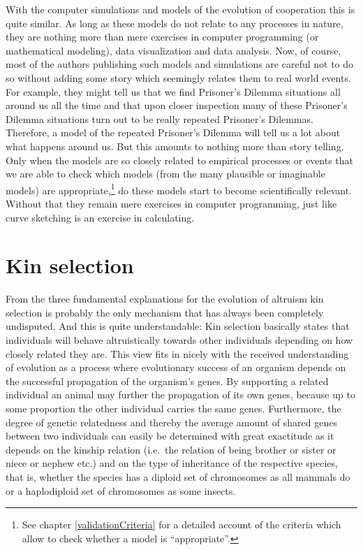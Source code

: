 With the computer simulations and models of the evolution of cooperation this
is quite similar. As long as these models do not relate to any processes in
nature, they are nothing more than mere exercises in computer programming (or
mathematical modeling), data visualization and data analysis. Now, of course,
most of the authors publishing such models and simulations are careful not to
do so without adding some story which seemingly relates them
to real world events. For example, they might tell us that we find Prisoner's
Dilemma situations all around us all the time and that upon closer inspection
many of these Prisoner's Dilemma situations turn out to be really repeated
Prisoner's Dilemmas. Therefore, a model of the repeated Prisoner's Dilemma will
tell us a lot about what happens around us. But this amounts to nothing more
than story telling. Only when the models are so closely related to
empirical processes or events that we are able to check which models (from the
many plausible or imaginable models) are appropriate,\footnote{See chapter
\ref{validationCriteria} for a detailed account of the criteria which allow to 
check whether a model is ``appropriate''.} do these
models start to become scientifically relevant. Without that they remain
mere exercises in computer programming, just like curve sketching is an
exercise in calculating.

\section{Kin selection}

From the three fundamental explanations for the evolution of altruism kin
selection is probably the only mechanism that has always been completely
undisputed. And this is quite understandable: Kin selection basically states
that individuals will behave altruistically towards other individuals
depending on how closely related they are. This view fits in nicely with the
received understanding of evolution as a process where evolutionary success of
an organism depends on the successful propagation of the organism's genes. By
supporting a related individual an animal may further the propagation of its
own genes, because up to some proportion the other individual carries the same
genes. Furthermore, the degree of genetic relatedness and thereby the average
amount of shared genes between two individuals can easily be determined with
great exactitude as it depends on the kinship relation (i.e.\ the relation of
being brother or sister or niece or nephew etc.) and on the type of inheritance
of the respective species, that is, whether the species has a diploid set of
chromosomes as all mammals do or a haplodiploid set of chromosomes as some
insects.

